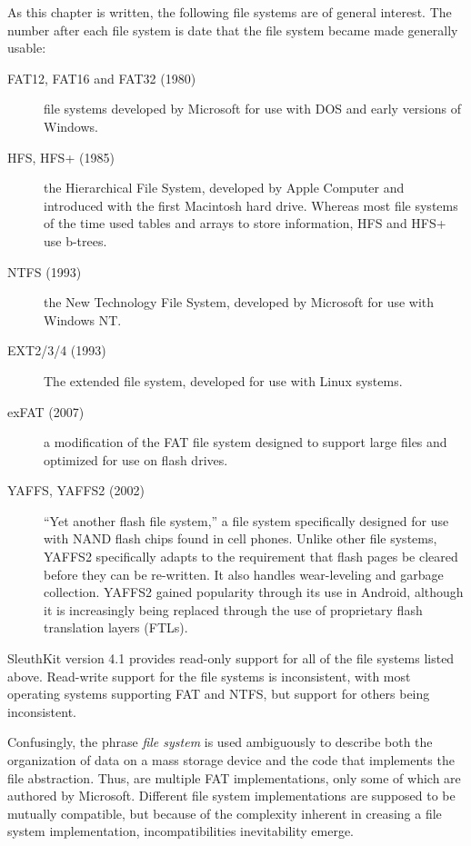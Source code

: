 As this chapter is written, the following file systems are of general
interest. The number after each file system is date that the file
system became made generally usable:
\begin{description}
\item[FAT12, FAT16 and FAT32 (1980)] file systems developed by Microsoft for use with
  DOS and early versions of Windows. 
  
\item[HFS, HFS+ (1985)] the Hierarchical File System, developed by Apple
  Computer and introduced with the first Macintosh hard
  drive. Whereas most file systems of the time used tables and arrays to store
  information, HFS and HFS+ use b-trees.
\item[NTFS (1993)] the New Technology File System, developed by
  Microsoft for use with Windows NT. 
\item[EXT2/3/4 (1993)] The extended file system, developed for use with Linux systems.
\item[exFAT (2007)] a modification of the FAT file system designed to
  support large files and optimized for use on flash drives.
\item[YAFFS, YAFFS2 (2002)] ``Yet another flash file system,'' a file
  system specifically designed for use with NAND flash chips found in
  cell phones. Unlike other file systems, YAFFS2 specifically adapts
  to the requirement that flash pages be cleared before they can be
  re-written. It also handles wear-leveling and garbage collection.
  YAFFS2 gained popularity through its use in Android, although it is
  increasingly being replaced through the use of proprietary flash
  translation layers (FTLs).
\end{description}

SleuthKit version 4.1 provides read-only support for all of the file
systems listed above. Read-write support for the file systems is
inconsistent, with most operating systems supporting FAT and NTFS,
but support for others being inconsistent.

Confusingly, the phrase \emph{file system} is used ambiguously to
describe both the organization of data on a mass storage device and
the code that implements the file abstraction. Thus, are multiple FAT
implementations, only some of which are authored by
Microsoft. Different file system implementations are supposed to be
mutually compatible, but because of the complexity inherent in
creasing a file system implementation, incompatibilities inevitability
emerge.

